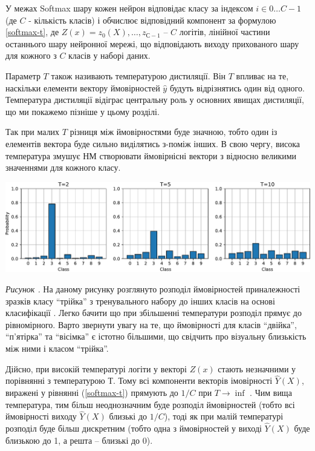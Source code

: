 \documentclass[14pt,a4paper]{extarticle}
\newcounter{e}
\newcounter{pic}
\newcommand{\pic}[1]{\refstepcounter{pic} \vspace{-0.3cm}\textit{Рисунок \arabic{pic}\label{#1}.}}
\numberwithin{equation}{section}
\numberwithin{figure}{section}
\begin{document}
 У межах Softmax шару кожен нейрон відповідає класу за індексом $i \in 0 \dots C-1$ (де $C$ - кількість класів) і обчислює відповідний компонент за формулою \ref{softmax-t}, де $Z(x) = z_0(X), \dots , z_{С-1}$ -- $C$ логітів, лінійної частини останнього шару нейронної мережі, що відповідають виходу прихованого шару для кожного з $C$ класів у наборі даних.
 
 Параметр $T$ також називають температурою дистиляції. Він $T$ впливає на те, наскільки елементи вектору ймовірностей $\hat{y}$ будуть відрізнятись один від одного. Температура дистиляції відіграє центральну роль у основних явищах дистиляції, що ми покажемо пізніше у цьому розділі.

 Так при малих $T$ різниця між ймовірностями буде значною, тобто один із елементів вектора буде сильно виділятись з-поміж інших. В свою чергу, висока температура змушує НМ створювати ймовірнісні вектори з відносно великими значеннями для кожного класу.
 
 \begin{center}
 	\includegraphics[width=17cm]{../images/TvsP.pdf}
 \end{center}
 \begin{center}
 	\pic{distilation} На даному рисунку розглянуто розподіл ймовірностей приналежності зразків класу ``трійка'' з тренувального набору до інших класів на основі класифікації . Легко бачити що при збільшенні температури розподіл прямує до рівномірного. Варто звернути увагу на те, що ймовірності для класів ``двійка'', ``п'ятірка'' та ``вісімка'' є істотно більшими, що свідчить про візуальну близькість між ними і класом ``трійка''.
 \end{center}
 
 Дійсно, при високій температурі логіти у векторі $Z(x)$ стають незначними у порівнянні з температурою $Т$. Тому всі компоненти векторів імовірності $\hat{Y}(X)$, виражені у рівнянні (\ref{softmax-t}) прямують до 
 $1/C$ при $T \to \inf$ . Чим вища температура,
 тим більш неоднозначним буде розподіл ймовірностей (тобто всі
 ймовірності виходу $\hat{Y}(X)$ близькі до $1/C$), тоді як
 при малій температурі розподіл буде більш дискретним (тобто одна з ймовірностей у
 виході $\hat{Y}(X)$ буде близькою до 1, а решта -- близькі до 0).
 
\end{document}
